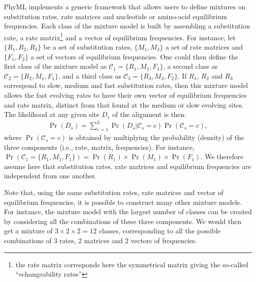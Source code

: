 \documentclass[a4paper,12pt]{article}
\begin{document}
PhyML implements  a generic framework  that allows users to  define mixtures on  substitution rates,
rate matrices and nucleotide or amino-acid equilibrium  frequencies. Each class of the mixture model
is built by assembling a substitution rate,  a rate matrix\footnote{the rate matrix corresponds here
the symmetrical  matrix giving the so-called  ``echangeability rates''} and a  vector of equilibrium
frequencies.  For  instance, let $\{R_1,R_2,R_3\}$ be  a set of substitution  rates, $\{M_1,M_2\}$ a
set of rate matrices and $\{F_1,F_2\}$ a set  of vectors of equilibrium frequencies.  One could then
define the first class of the mixture model  as $\mathcal{C}_1 = \{R_1,M_1,F_1\}$, a second class as
$\mathcal{C}_2  = \{R_2,M_1,F_1\}$,  and a  third class  as $\mathcal{C}_3  = \{R_3,M_2,F_2\}$.   If
$R_1$, $R_2$  and $R_3$ correspond to  slow, medium and  fast substitution rates, then  this mixture
model allows the  fast evolving rates to have  their own vector of equilibrium  frequencies and rate
matrix, distinct from that found at the medium  or slow evolving sites.  The likelihood at any given
site $D_s$ of the alignment is then:
\begin{eqnarray*}
\Pr(D_s) = \sum_{c=1}^{3} \Pr(D_s | \mathcal{C}_s=c) \Pr(\mathcal{C}_s=c),
\label{equ:mixtlk}
\end{eqnarray*}
where  $\Pr(\mathcal{C}_s=c)$ is  obtained by  multiplying the  probability (density)  of  the three
components (i.e., rate, matrix, frequencies). For instance, $\Pr(\mathcal{C}_1=\{R_1,M_1,F_1\}) =
 \Pr(R_1)\times \Pr(M_1) \times \Pr(F_1)$.
We therefore assume here that substitution rates, rate
matrices and equilibrium frequencies are independent from one another.

Note that, using the  same substitution rates, rate matrices and  vector of equilibrium frequencies,
it is  possible to construct  many other mixture  models. For instance,  the mixture model  with the
largest  number of  classes  can be  created  by considering  all the  combinations  of these  three
components.  We would  then get a mixture of  $3\times 2 \times 2=12$ classes,  corresponding to all
the possible combinations of 3 rates, 2 matrices and 2 vectors of frequencies.


\end{document}
